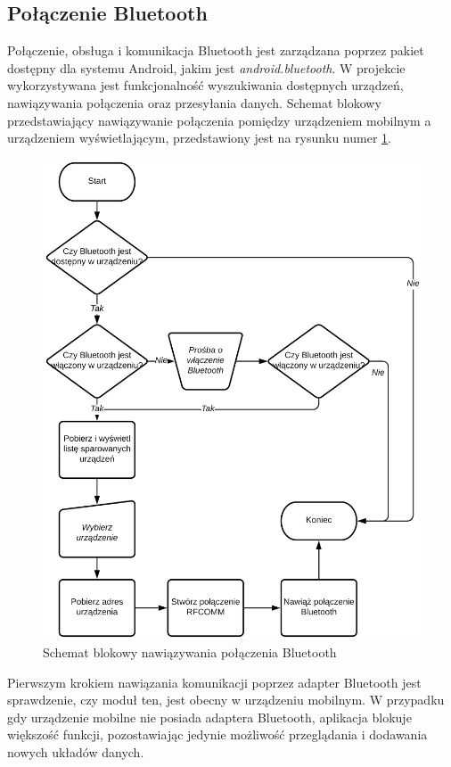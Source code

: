 \documentclass[a4paper,12pt, twoside]{article}
\begin{document}
    	\subsection{Połączenie Bluetooth}
    	Połączenie, obsługa i komunikacja Bluetooth jest zarządzana poprzez pakiet dostępny dla systemu Android, jakim jest \textit{android.bluetooth}\cite{android.bluetooth}. W projekcie wykorzystywana jest funkcjonalność wyszukiwania dostępnych urządzeń, nawiązywania połączenia oraz przesyłania danych. Schemat blokowy przedstawiający nawiązywanie połączenia pomiędzy urządzeniem mobilnym a urządzeniem wyświetlającym, przedstawiony jest na rysunku numer \ref{fig:btconnect}. 
    	\begin{figure}[H]
    	        \centering
    			\includegraphics[width=12cm]{images/rys_12bluetoothconnection.png}
    			\caption{Schemat blokowy nawiązywania połączenia Bluetooth}
                \label{fig:btconnect}
    	\end{figure}
    	Pierwszym krokiem nawiązania komunikacji poprzez adapter Bluetooth jest sprawdzenie, czy moduł ten, jest obecny w urządzeniu mobilnym. W przypadku gdy urządzenie mobilne nie posiada adaptera Bluetooth, aplikacja blokuje większość funkcji, pozostawiając jedynie możliwość przeglądania i dodawania nowych układów danych. 
    	
\end{document}
